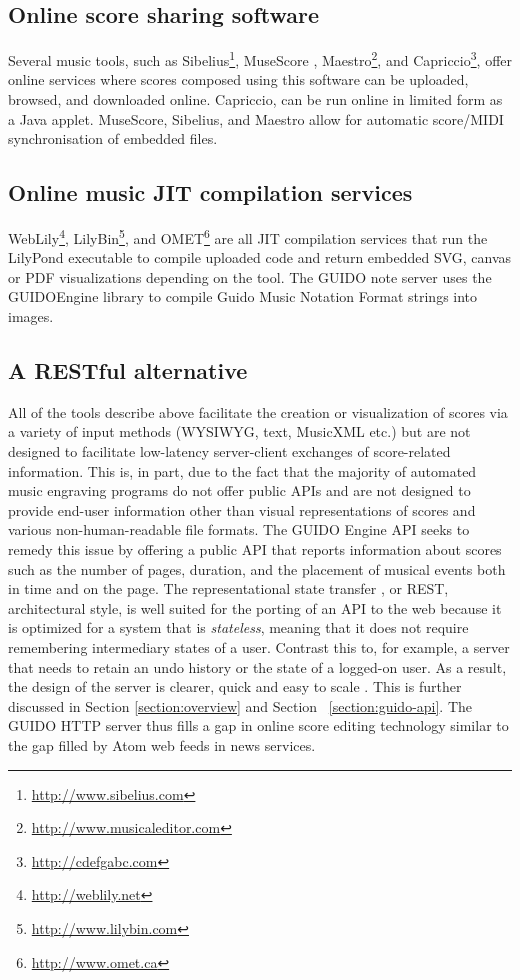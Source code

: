 \documentclass[11pt,a4paper]{article}
\newcommand{\footurl}[1]	{\footnote{\url{#1}}}
\begin{document}
\subsection{Online score sharing software}\label{subsection:sharing}
Several music tools, such as Sibelius\footurl{http://www.sibelius.com}, MuseScore \cite{musescore}, Maestro\footurl{http://www.musicaleditor.com}, and Capriccio\footurl{http://cdefgabc.com}, offer online services where scores composed using this software can be uploaded, browsed, and downloaded online.  Capriccio, can be run online in limited form as a Java applet.  MuseScore, Sibelius, and Maestro allow for automatic score/MIDI synchronisation of embedded files.
\subsection{Online music JIT compilation services}\label{subsection:jit}
WebLily\footurl{http://weblily.net}, LilyBin\footurl{http://www.lilybin.com}, and OMET\footurl{http://www.omet.ca} are all JIT compilation services that run the LilyPond executable to compile uploaded code and return embedded SVG, canvas or PDF visualizations depending on the tool.  The GUIDO note server \cite{renz98} uses the GUIDOEngine library to compile Guido Music Notation Format \cite{hoos98} strings into images.
\subsection{A RESTful alternative}\label{subsection:restful}

All of the tools describe above facilitate the creation or visualization of scores via a variety of input methods (WYSIWYG, text, MusicXML etc.) but are not designed to facilitate low-latency server-client exchanges of score-related information.  This is, in part, due to the fact that the majority of automated music engraving programs do not offer public APIs and are not designed to provide end-user information other than visual representations of scores and various non-human-readable file formats.  The GUIDO Engine API \cite{daudin09a} \cite{guidolib1.52} seeks to remedy this issue by offering a public API that reports information about scores such as the number of pages, duration, and the placement of musical events both in time and on the page.  The representational state transfer \cite{Fielding00}, or REST, architectural style, is well suited for the porting of an API to the web because it is optimized for a system that is \emph{stateless}, meaning that it does not require remembering intermediary states of a user.  Contrast this to, for example, a server that needs to retain an undo history or the state of a logged-on user.  As a result, the design of the server is clearer, quick and easy to scale \cite{richardson2008restful}.  This is further discussed in Section \ref{section:overview} and Section ~\ref{section:guido-api}.  The GUIDO HTTP server thus fills a gap in online score editing technology similar to the gap filled by Atom web feeds in news services.
\end{document}
